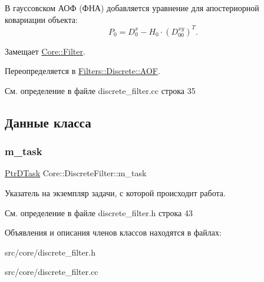 В гауссовском АОФ (ФНА) добавляется уравнение для апостериорной ковариации объекта\+: \[P_0 = D_0^x - H_0 \cdot (D_{00}^{xy})^T.\] 

Замещает \hyperlink{class_core_1_1_filter_af95880b734c4b8dc3d8c02f222b32506}{Core\+::\+Filter}.



Переопределяется в \hyperlink{class_filters_1_1_discrete_1_1_a_o_f_aa822fe74d7ca160f898db1c1289e17f7}{Filters\+::\+Discrete\+::\+A\+OF}.



См. определение в файле discrete\+\_\+filter.\+cc строка 35



\subsection{Данные класса}
\hypertarget{class_core_1_1_discrete_filter_a6a2d67be8eaa0df383fe080474975faa}{}\label{class_core_1_1_discrete_filter_a6a2d67be8eaa0df383fe080474975faa} 
\subsubsection{\texorpdfstring{m\+\_\+task}{m\_task}}
{\footnotesize\ttfamily \hyperlink{namespace_core_a9cd3f9b81303651b8d115031018f0ebf}{Ptr\+D\+Task} Core\+::\+Discrete\+Filter\+::m\+\_\+task\hspace{0.3cm}{\ttfamily [protected]}}

Указатель на экземпляр задачи, с которой происходит работа. 

См. определение в файле discrete\+\_\+filter.\+h строка 43



Объявления и описания членов классов находятся в файлах\+:\begin{DoxyCompactItemize}
\item 
src/core/discrete\+\_\+filter.\+h\item 
src/core/discrete\+\_\+filter.\+cc\end{DoxyCompactItemize}
